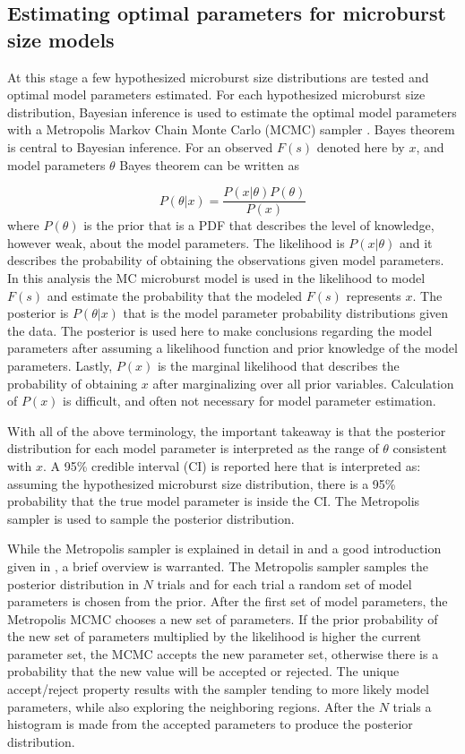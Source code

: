 \documentclass[draft]{agujournal2019}
\begin{document}
\subsection{Estimating optimal parameters for microburst size models}
At this stage a few hypothesized microburst size distributions are tested and optimal model parameters estimated. For each hypothesized microburst size distribution, Bayesian inference is used to estimate the optimal model parameters with a Metropolis Markov Chain Monte Carlo (MCMC) sampler \cite{Metropolis1953}. Bayes theorem is central to Bayesian inference. For an observed $F(s)$ denoted here by $x$, and model parameters $\theta$ Bayes theorem can be written as

\begin{equation}
P(\theta | x) = \frac{P(x | \theta) P(\theta)}{P(x)}
\end{equation} where $P(\theta)$ is the prior that is a PDF that describes the level of knowledge, however weak, about the model parameters. The likelihood is $P(x | \theta)$ and it describes the probability of obtaining the observations given model parameters. In this analysis the MC microburst model is used in the likelihood to model $F(s)$ and estimate the probability that the modeled $F(s)$ represents $x$. The posterior is $P(\theta | x)$ that is the model parameter probability distributions given the data. The posterior is used here to make conclusions regarding the model parameters after assuming a likelihood function and prior knowledge of the model parameters. Lastly, $P(x)$ is the marginal likelihood that describes the probability of obtaining $x$ after marginalizing over all prior variables. Calculation of $P(x)$ is difficult, and often not necessary for model parameter estimation. 

With all of the above terminology, the important takeaway is that the posterior distribution for each model parameter is interpreted as the range of $\theta$ consistent with $x$. A 95\% credible interval (CI) is reported here that is interpreted as: assuming the hypothesized microburst size distribution, there is a 95\% probability that the true model parameter is inside the CI. The Metropolis sampler is used to sample the posterior distribution.

While the Metropolis sampler is explained in detail in  and a good introduction given in , a brief overview is warranted. The Metropolis sampler samples the posterior distribution in $N$ trials and for each trial a random set of model parameters is chosen from the prior. After the first set of model parameters, the Metropolis MCMC chooses a new set of parameters. If the prior probability of the new set of parameters multiplied by the likelihood is higher the current parameter set, the MCMC accepts the new parameter set, otherwise there is a probability that the new value will be accepted or rejected. The unique accept/reject property results with the sampler tending to more likely model parameters, while also exploring the neighboring regions. After the $N$ trials a histogram is made from the accepted parameters to produce the posterior distribution.
\end{document}
